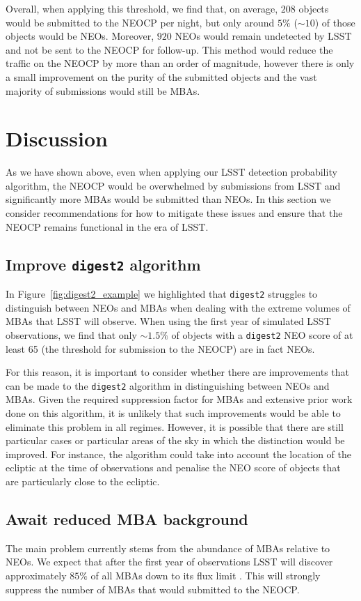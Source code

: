 \documentclass[twocolumn]{aastex631}
\newcommand{\dig}{\texttt{digest2}}
\newcommand{\npernightAlg}{208}
\newcommand{\purityAlg}{5}
\newcommand{\purityAlgRaw}{10}
\newcommand{\neoLostAlg}{920}
\begin{document}
Overall, when applying this threshold, we find that, on average, $\npernightAlg{}$ objects would be submitted to the NEOCP per night, but only around $\purityAlg{}\%$ (${\sim}\purityAlgRaw{}$) of those objects would be NEOs. Moreover, $\neoLostAlg{}$ NEOs would remain undetected by LSST and not be sent to the NEOCP for follow-up. This method would reduce the traffic on the NEOCP by more than an order of magnitude, however there is only a small improvement on the purity of the submitted objects and the vast majority of submissions would still be MBAs. 

\section{Discussion} \label{sec:discussion}
As we have shown above, even when applying our LSST detection probability algorithm, the NEOCP would be overwhelmed by submissions from LSST and significantly more MBAs would be submitted than NEOs. In this section we consider recommendations for how to mitigate these issues and ensure that the NEOCP remains functional in the era of LSST.

\subsection{Improve \dig{} algorithm}
In Figure~\ref{fig:digest2_example} we highlighted that \dig{} struggles to distinguish between NEOs and MBAs when dealing with the extreme volumes of MBAs that LSST will observe. When using the first year of simulated LSST observations, we find that only ${\sim}1.5\%$ of objects with a \dig{} NEO score of at least 65 (the threshold for submission to the NEOCP) are in fact NEOs.

For this reason, it is important to consider whether there are improvements that can be made to the \dig{} algorithm in distinguishing between NEOs and MBAs. Given the required suppression factor for MBAs and extensive prior work done on this algorithm, it is unlikely that such improvements would be able to eliminate this problem in all regimes. However, it is possible that there are still particular cases or particular areas of the sky in which the distinction would be improved. For instance, the algorithm could take into account the location of the ecliptic at the time of observations and penalise the NEO score of objects that are particularly close to the ecliptic.

\subsection{Await reduced MBA background}
The main problem currently stems from the abundance of MBAs relative to NEOs. We expect that after the first year of observations LSST will discover approximately $85\%$ of all MBAs down to its flux limit \citep{Juric+2020}. This will strongly suppress the number of MBAs that would submitted to the NEOCP.
\end{document}
